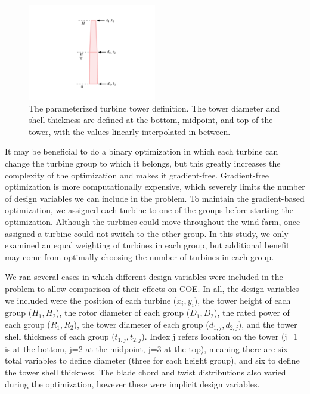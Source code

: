 \documentclass[WESD, manuscript]{copernicus}
\begin{document}
\begin{figure}[htbp]
  \centering
  \includegraphics[trim={0 1.5cm 0 2cm},clip,width=0.5\textwidth]{Figures/tower_param.pdf}
  \caption{\label{tower_def} The parameterized turbine tower definition. The tower diameter and shell thickness are defined at the bottom, midpoint, and top of the tower, with the values linearly interpolated in between.}
\end{figure}
        
        It may be beneficial to do a binary optimization in which each turbine can change the turbine group to which it belongs, but this greatly increases the complexity of the optimization and makes it gradient-free. Gradient-free optimization is more computationally expensive, which severely limits the number of design variables we can include in the problem. To maintain the gradient-based optimization, we assigned each turbine to one of the groups before starting the optimization. Although the turbines could move throughout the wind farm, once assigned a turbine could not switch to the other group. In this study, we only examined an equal weighting of turbines in each group, but additional benefit may come from optimally choosing the number of turbines in each group.
        
        We ran several cases in which different design variables were included in the problem to allow comparison of their effects on COE. In all, the design variables we included were the position of each turbine ($x_i,y_i$), the tower height of each group ($H_1, H_2$), the rotor diameter of each group ($D_1, D_2$), the rated power of each group ($R_1, R_2$), the tower diameter of each group ($d_{1,j}, d_{2,j}$), and the tower shell thickness of each group ($t_{1,j}, t_{2,j}$). Index j refers location on the tower (j=1 is at the bottom, j=2 at the midpoint, j=3 at the top), meaning there are six total variables to define diameter (three for each height group), and six to define the tower shell thickness. The blade chord and twist distributions also varied during the optimization, however these were implicit design variables.
                
\end{document}

